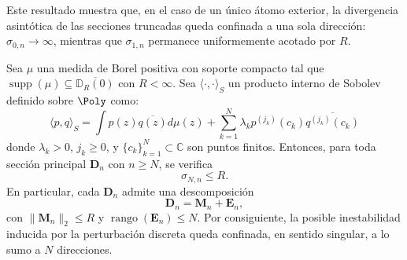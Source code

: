Este resultado muestra que, en el caso de un único átomo exterior, la divergencia asintótica de las secciones truncadas queda confinada a una sola dirección: $\sigma_{0,n} \to \infty$, mientras que $\sigma_{1,n}$ permanece uniformemente acotado por $R$.

\begin{thm}\label{thm:control_singular_escape}
	Sea $\mu$ una medida de Borel positiva con soporte compacto tal que $\operatorname{supp}(\mu) \subseteq \overline{\mathbb{D}_R(0)}$ con $R < \infty$. Sea $\langle \cdot, \cdot \rangle_S$ un producto interno de Sobolev definido sobre $\Poly$ como:
	\begin{equation}\label{eq:sobolev_general_singular}
		\langle p, q \rangle_S = \int p(z)\overline{q(z)} d\mu(z) + \sum_{k=1}^N \lambda_k p^{(j_k)}(c_k) \overline{q^{(j_k)}(c_k)}
	\end{equation}
	donde $\lambda_k > 0$, $j_k \ge 0$, y $\{c_k\}_{k=1}^N \subset \mathbb{C}$ son puntos finitos. Entonces, para toda sección principal $\mathbf{D}_n$ con $n \ge N$, se verifica
	\[
		\sigma_{N,n} \le R.
	\]
	En particular, cada $\mathbf{D}_n$ admite una descomposición
	\[
		\mathbf{D}_n = \mathbf{M}_n + \mathbf{E}_n,
	\]
	con $\|\mathbf{M}_n\|_2 \le R$ y $\operatorname{rango}(\mathbf{E}_n) \le N$. Por consiguiente, la posible inestabilidad inducida por la perturbación discreta queda confinada, en sentido singular, a lo sumo a $N$ direcciones.
\end{thm}


